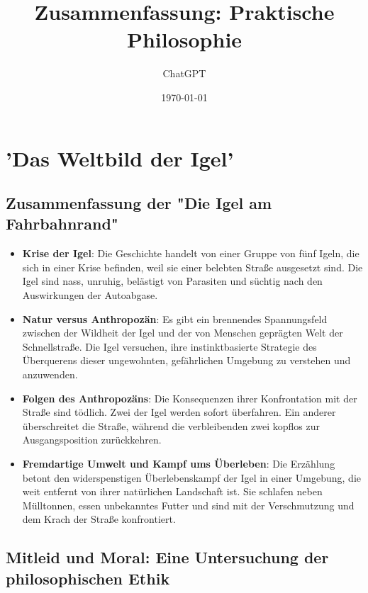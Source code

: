 \documentclass{article}
\title{Zusammenfassung: Praktische Philosophie}
\date{\today}
\author{ChatGPT}
\begin{document}
\maketitle

\tableofcontents


\section{'Das Weltbild der Igel'}

\subsection{Zusammenfassung der "Die Igel am Fahrbahnrand"}

\begin{itemize}
	\item \textbf{Krise der Igel}: Die Geschichte handelt von einer Gruppe von fünf Igeln, die sich in einer Krise befinden, weil sie einer belebten Straße ausgesetzt sind. Die Igel sind nass, unruhig, belästigt von Parasiten und süchtig nach den Auswirkungen der Autoabgase.

	\item \textbf{Natur versus Anthropozän}: Es gibt ein brennendes Spannungsfeld zwischen der Wildheit der Igel und der von Menschen geprägten Welt der Schnellstraße. Die Igel versuchen, ihre instinktbasierte Strategie des Überquerens dieser ungewohnten, gefährlichen Umgebung zu verstehen und anzuwenden.

	\item \textbf{Folgen des Anthropozäns}: Die Konsequenzen ihrer Konfrontation mit der Straße sind tödlich. Zwei der Igel werden sofort überfahren. Ein anderer überschreitet die Straße, während die verbleibenden zwei kopflos zur Ausgangsposition zurückkehren.

	\item \textbf{Fremdartige Umwelt und Kampf ums Überleben}: Die Erzählung betont den widerspenstigen Überlebenskampf der Igel in einer Umgebung, die weit entfernt von ihrer natürlichen Landschaft ist. Sie schlafen neben Mülltonnen, essen unbekanntes Futter und sind mit der Verschmutzung und dem Krach der Straße konfrontiert.
\end{itemize}

\subsection{Mitleid und Moral: Eine Untersuchung der philosophischen Ethik}
\end{document}
